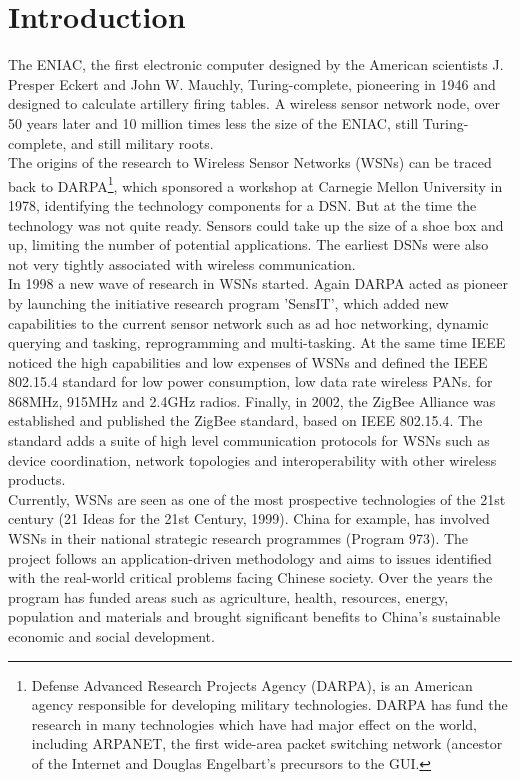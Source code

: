\section{Introduction}
The ENIAC, the first electronic computer designed by the American scientists J. Presper Eckert and John W. Mauchly, Turing-complete,  pioneering in 1946 and designed to calculate artillery firing tables. A wireless sensor network node, over 50 years later and 10 million times less the size of the ENIAC, still Turing-complete, and still military roots.\\
The origins of the research to Wireless Sensor Networks (WSNs) can be traced back to DARPA\footnote{Defense Advanced Research Projects Agency (DARPA), is an American agency responsible for developing military technologies. DARPA has fund the research in many technologies which have had major effect on the world, including ARPANET, the first wide-area packet switching network (ancestor of the Internet and Douglas Engelbart's precursors to the GUI.}, which sponsored a workshop at Carnegie Mellon University in 1978, identifying the technology components for a DSN. But at the time the technology was not quite ready. Sensors could take up the size of a shoe box and up, limiting the number of potential applications. The earliest DSNs were also not very tightly associated with wireless communication.\\
In 1998 a new wave of research in WSNs started. Again DARPA acted as pioneer by launching the initiative research program 'SensIT', which added new capabilities to the current sensor network such as ad hoc networking, dynamic querying and tasking, reprogramming and multi-tasking. At the same time IEEE noticed the high capabilities and low expenses of WSNs and defined the IEEE 802.15.4 standard for low power consumption, low data rate wireless PANs. for 868MHz, 915MHz and 2.4GHz radios. Finally, in 2002, the ZigBee Alliance was established and published the ZigBee standard, based on IEEE 802.15.4. The standard adds a suite of high level communication protocols for WSNs such as device coordination, network topologies and interoperability with other wireless products.\\
Currently, WSNs are seen as one of the most prospective technologies of the 21st century (21 Ideas for the 21st Century, 1999). China for example, has involved WSNs in their national strategic research programmes (Program 973). The project follows an application-driven methodology and aims to issues identified with the real-world critical problems facing Chinese society. Over the years the program has funded areas such as agriculture, health, resources, energy, population and materials and brought significant benefits to China's sustainable economic and social development.
